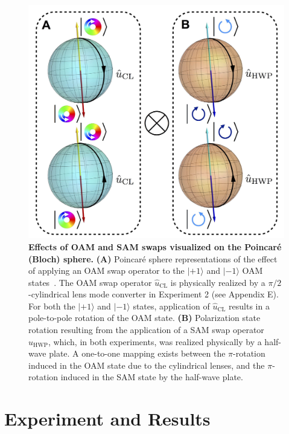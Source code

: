 \documentclass[12pt]{iopart}
\begin{document}
%
\begin{figure}[t]
	\centering
	\includegraphics[width=0.9\columnwidth]{fig1.jpg}
	\caption{{\bf Effects of OAM and SAM swaps visualized on the Poincar\'e (Bloch) sphere.} {\bf (A)} Poincar\'e sphere representations of the effect of applying an OAM swap operator to the $|+1\rangle$ and $|-1\rangle$ OAM states~\cite{padgett:99}. The OAM swap operator $\hat{u}_\mathrm{CL}$ is physically realized by a $\pi/2$-cylindrical lens mode converter in Experiment 2 (see Appendix E). For both the $|+1\rangle$ and $|-1\rangle$ states, application of $\hat{u}_\mathrm{CL}$ results in a pole-to-pole rotation of the OAM state. {\bf (B)} Polarization state rotation resulting from the application of a SAM swap operator $\hat{u}_\mathrm{HWP}$, which, in both experiments, was realized physically by a half-wave plate. A one-to-one mapping exists between the $\pi$-rotation induced in the OAM state due to the cylindrical lenses, and the $\pi$-rotation induced in the SAM state by the half-wave plate.}%
	\label{fig:fig1}
\end{figure}
%

%
\section{Experiment and Results}
\end{document}
